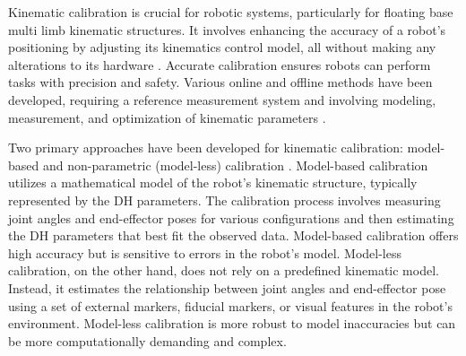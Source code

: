 
Kinematic calibration is crucial for robotic systems, particularly for floating base multi limb kinematic structures. It involves enhancing the accuracy of a robot's positioning by adjusting its kinematics control model, all without making any alterations to its hardware \cite{ChenGang2014Reviewkinematicscalibration}. Accurate calibration ensures robots can perform tasks with precision and safety. Various online and offline methods have been developed, requiring a reference measurement system and involving modeling, measurement, and optimization of kinematic parameters \cite{Petrivc2023Kinematicmodelcalibration}.

Two primary approaches have been developed for kinematic calibration: model-based and non-parametric (model-less) calibration \cite{ChenGang2014Reviewkinematicscalibration}. Model-based calibration utilizes a mathematical model of the robot's kinematic structure, typically represented by the DH parameters. The calibration process involves measuring joint angles and end-effector poses for various configurations and then estimating the DH parameters that best fit the observed data. Model-based calibration offers high accuracy but is sensitive to errors in the robot's model. Model-less calibration, on the other hand, does not rely on a predefined kinematic model. Instead, it estimates the relationship between joint angles and end-effector pose using a set of external markers, fiducial markers, or visual features in the robot's environment. Model-less calibration is more robust to model inaccuracies but can be more computationally demanding and complex.


